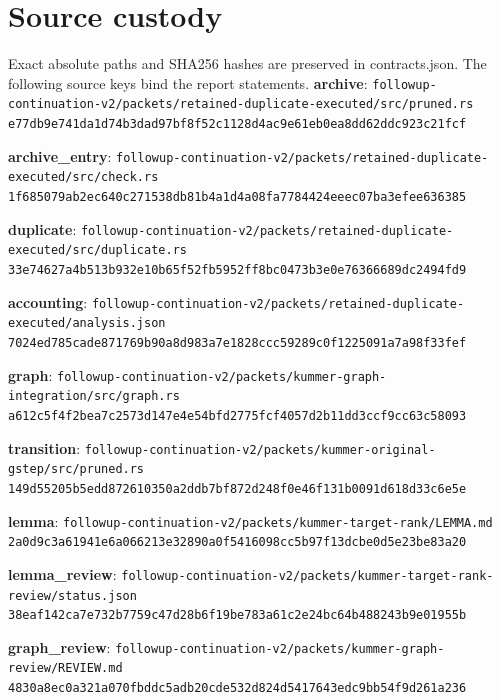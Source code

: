 \documentclass[10pt]{article}
\begin{document}
\section*{Source custody}
Exact absolute paths and SHA256 hashes are preserved in contracts.json. The following source keys bind the report statements.
\textbf{archive}: \nolinkurl{followup-continuation-v2/packets/retained-duplicate-executed/src/pruned.rs}\\{\scriptsize\texttt{e77db9e741da1d74b3dad97bf8f52c1128d4ac9e61eb0ea8dd62ddc923c21fcf}}\par
\textbf{archive\_entry}: \nolinkurl{followup-continuation-v2/packets/retained-duplicate-executed/src/check.rs}\\{\scriptsize\texttt{1f685079ab2ec640c271538db81b4a1d4a08fa7784424eeec07ba3efee636385}}\par
\textbf{duplicate}: \nolinkurl{followup-continuation-v2/packets/retained-duplicate-executed/src/duplicate.rs}\\{\scriptsize\texttt{33e74627a4b513b932e10b65f52fb5952ff8bc0473b3e0e76366689dc2494fd9}}\par
\textbf{accounting}: \nolinkurl{followup-continuation-v2/packets/retained-duplicate-executed/analysis.json}\\{\scriptsize\texttt{7024ed785cade871769b90a8d983a7e1828ccc59289c0f1225091a7a98f33fef}}\par
\textbf{graph}: \nolinkurl{followup-continuation-v2/packets/kummer-graph-integration/src/graph.rs}\\{\scriptsize\texttt{a612c5f4f2bea7c2573d147e4e54bfd2775fcf4057d2b11dd3ccf9cc63c58093}}\par
\textbf{transition}: \nolinkurl{followup-continuation-v2/packets/kummer-original-gstep/src/pruned.rs}\\{\scriptsize\texttt{149d55205b5edd872610350a2ddb7bf872d248f0e46f131b0091d618d33c6e5e}}\par
\textbf{lemma}: \nolinkurl{followup-continuation-v2/packets/kummer-target-rank/LEMMA.md}\\{\scriptsize\texttt{2a0d9c3a61941e6a066213e32890a0f5416098cc5b97f13dcbe0d5e23be83a20}}\par
\textbf{lemma\_review}: \nolinkurl{followup-continuation-v2/packets/kummer-target-rank-review/status.json}\\{\scriptsize\texttt{38eaf142ca7e732b7759c47d28b6f19be783a61c2e24bc64b488243b9e01955b}}\par
\textbf{graph\_review}: \nolinkurl{followup-continuation-v2/packets/kummer-graph-review/REVIEW.md}\\{\scriptsize\texttt{4830a8ec0a321a070fbddc5adb20cde532d824d5417643edc9bb54f9d261a236}}\par
\end{document}
